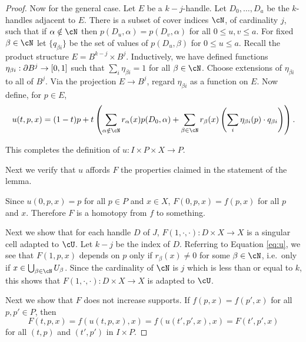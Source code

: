 \begin{proof}
Now for the general case.
Let $E$ be a $k{-}j$-handle.
Let $D_0,\ldots,D_a$ be the $k$-handles adjacent to $E$.
There is a subset of cover indices $\cN$, of cardinality $j$, 
such that if $\alpha\notin\cN$ then
$p(D_u, \alpha) = p(D_v, \alpha)$ for all $0\le u,v \le a$.
For fixed $\beta\in\cN$ let $\{q_{\beta i}\}$ be the set of values of 
$p(D_u, \beta)$ for $0\le u \le a$.
Recall the product structure $E = B^{k-j}\times B^j$.
Inductively, we have defined functions $\eta_{\beta i}:\partial B^j \to [0,1]$ such that
$\sum_i \eta_{\beta i} = 1$ for all $\beta\in \cN$.
Choose extensions of $\eta_{\beta i}$ to all of $B^j$.
Via the projection $E\to B^j$, regard $\eta_{\beta i}$ as a function on $E$.
Now define, for $p \in E$,
\begin{equation}
\label{eq:u}
    u(t, p, x) = (1-t)p + t \left(
            \sum_{\alpha \notin \cN} r_\alpha(x) p(D_0, \alpha)
                + \sum_{\beta \in \cN} r_\beta(x) \left( \sum_i \eta_{\beta i}(p) \cdot q_{\beta i} \right)
             \right) .
\end{equation}

This completes the definition of $u: I \times P \times X \to P$.

\medskip

Next we verify that $u$ affords $F$ the properties claimed in the statement of the lemma.

Since $u(0, p, x) = p$ for all $p\in P$ and $x\in X$, $F(0, p, x) = f(p, x)$ for all $p$ and $x$.
Therefore $F$ is a homotopy from $f$ to something.


\medskip

Next we show that for each handle $D$ of $J$, $F(1, \cdot, \cdot) : D\times X \to X$
is a singular cell adapted to $\cU$.
Let $k-j$ be the index of $D$.
Referring to Equation \ref{eq:u}, we see that $F(1, p, x)$ depends on $p$ only if 
$r_\beta(x) \ne 0$ for some $\beta\in\cN$, i.e.\ only if
$x\in \bigcup_{\beta\in\cN} U_\beta$.
Since the cardinality of $\cN$ is $j$ which is less than or equal to $k$,
this shows that $F(1, \cdot, \cdot) : D\times X \to X$ is adapted to $\cU$.

\medskip

Next we show that $F$ does not increase supports.
If $f(p,x) = f(p',x)$ for all $p,p'\in P$,
then 
\[
	F(t, p, x) = f(u(t,p,x),x) = f(u(t',p',x),x) = F(t',p',x)
\]
for all $(t,p)$ and $(t',p')$ in $I\times P$.

\medskip


\end{proof}
